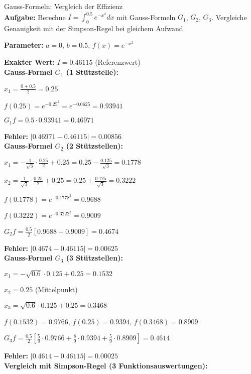 \begin{example2}{Gauss-Formeln: Vergleich der Effizienz}\\
\textbf{Aufgabe:} Berechne $I = \int_0^{0.5} e^{-x^2} dx$ mit Gauss-Formeln $G_1$, $G_2$, $G_3$. Vergleiche Genauigkeit mit der Simpson-Regel bei gleichem Aufwand

\textbf{Parameter:} $a = 0$, $b = 0.5$, $f(x) = e^{-x^2}$

\textbf{Exakter Wert:} $I = 0.46115$ (Referenzwert)
\vspace{2mm}\\
\textbf{Gauss-Formel $G_1$ (1 Stützstelle):}

$x_1 = \frac{0+0.5}{2} = 0.25$

$f(0.25) = e^{-0.25^2} = e^{-0.0625} = 0.93941$

$G_1f = 0.5 \cdot 0.93941 = 0.46971$

\textbf{Fehler:} $|0.46971 - 0.46115| = 0.00856$
\vspace{1mm}\\
\textbf{Gauss-Formel $G_2$ (2 Stützstellen):}

$x_1 = -\frac{1}{\sqrt{3}} \cdot \frac{0.25}{2} + 0.25 = 0.25 - \frac{0.125}{\sqrt{3}} = 0.1778$

$x_2 = \frac{1}{\sqrt{3}} \cdot \frac{0.25}{2} + 0.25 = 0.25 + \frac{0.125}{\sqrt{3}} = 0.3222$

$f(0.1778) = e^{-0.1778^2} = 0.9688$

$f(0.3222) = e^{-0.3222^2} = 0.9009$

$G_2f = \frac{0.5}{2}[0.9688 + 0.9009] = 0.4674$

\textbf{Fehler:} $|0.4674 - 0.46115| = 0.00625$
\vspace{1mm}\\
\textbf{Gauss-Formel $G_3$ (3 Stützstellen):}

$x_1 = -\sqrt{0.6} \cdot 0.125 + 0.25 = 0.1532$

$x_2 = 0.25$ (Mittelpunkt)

$x_3 = \sqrt{0.6} \cdot 0.125 + 0.25 = 0.3468$

$f(0.1532) = 0.9766$, $f(0.25) = 0.9394$, $f(0.3468) = 0.8909$

$G_3f = \frac{0.5}{2}[\frac{5}{9} \cdot 0.9766 + \frac{8}{9} \cdot 0.9394 + \frac{5}{9} \cdot 0.8909] = 0.4614$

\textbf{Fehler:} $|0.4614 - 0.46115| = 0.00025$
\vspace{1mm}\\
\textbf{Vergleich mit Simpson-Regel (3 Funktionsauswertungen):}


\end{example2}
